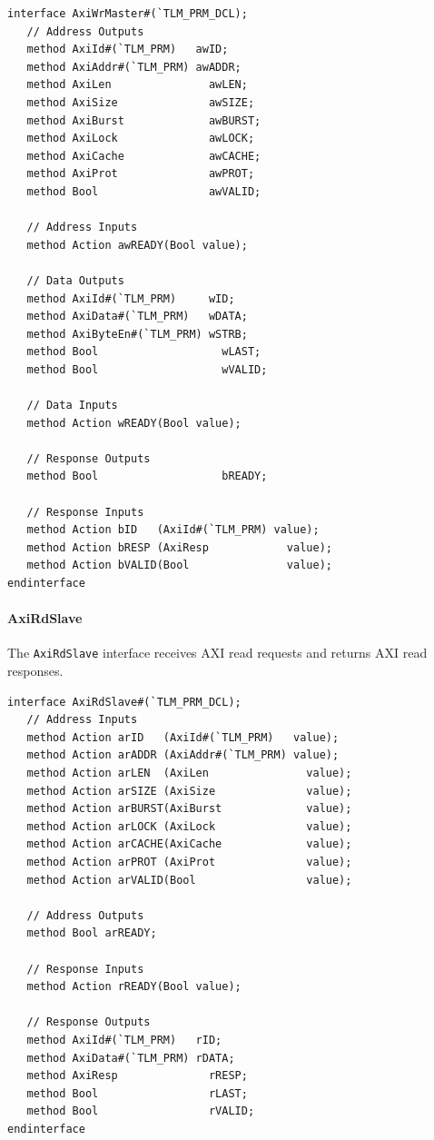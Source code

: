 \documentclass[twoside,letterpaper]{article}
\newcommand{\te}[1]{\texttt{#1}}
\begin{document}
\begin{verbatim}          
interface AxiWrMaster#(`TLM_PRM_DCL);
   // Address Outputs
   method AxiId#(`TLM_PRM)   awID;
   method AxiAddr#(`TLM_PRM) awADDR;
   method AxiLen               awLEN;
   method AxiSize              awSIZE;
   method AxiBurst             awBURST;
   method AxiLock              awLOCK;
   method AxiCache             awCACHE;
   method AxiProt              awPROT;
   method Bool                 awVALID;
      
   // Address Inputs
   method Action awREADY(Bool value);
      
   // Data Outputs
   method AxiId#(`TLM_PRM)     wID;
   method AxiData#(`TLM_PRM)   wDATA;
   method AxiByteEn#(`TLM_PRM) wSTRB;
   method Bool                   wLAST;
   method Bool                   wVALID;
      
   // Data Inputs
   method Action wREADY(Bool value);
      
   // Response Outputs
   method Bool                   bREADY;
      
   // Response Inputs
   method Action bID   (AxiId#(`TLM_PRM) value);
   method Action bRESP (AxiResp            value);
   method Action bVALID(Bool               value);
endinterface
\end{verbatim}


\paragraph{\bf AxiRdSlave} The \te{AxiRdSlave} interface receives AXI 
read requests and returns AXI read responses. 

\begin{verbatim}
interface AxiRdSlave#(`TLM_PRM_DCL);
   // Address Inputs
   method Action arID   (AxiId#(`TLM_PRM)   value);
   method Action arADDR (AxiAddr#(`TLM_PRM) value);
   method Action arLEN  (AxiLen               value);
   method Action arSIZE (AxiSize              value);
   method Action arBURST(AxiBurst             value);
   method Action arLOCK (AxiLock              value);
   method Action arCACHE(AxiCache             value);
   method Action arPROT (AxiProt              value);   
   method Action arVALID(Bool                 value);
      
   // Address Outputs
   method Bool arREADY;
      
   // Response Inputs
   method Action rREADY(Bool value);
      
   // Response Outputs
   method AxiId#(`TLM_PRM)   rID;
   method AxiData#(`TLM_PRM) rDATA;
   method AxiResp              rRESP;
   method Bool                 rLAST;
   method Bool                 rVALID;
endinterface
\end{verbatim}
\end{document}
